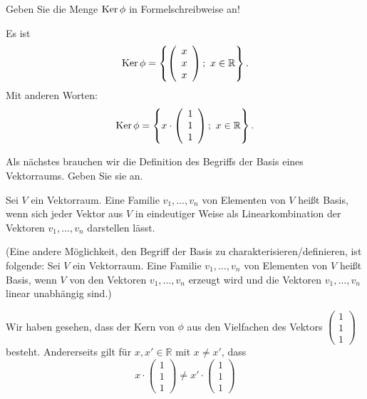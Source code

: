 \documentclass{ximera}
\begin{document}
\begin{question}
Geben Sie die Menge $\mathop{\rm Ker}\phi$ in Formelschreibweise an!
\begin{solution}
    \begin{free-response}
        Es ist 
\[
\mathop{\rm Ker}\phi = \left\{  \left(
\begin{array}{c}
x \\ x \\ x    
\end{array}
\right)  ;\ x\in \mathbb R  \right\}.
\]
Mit anderen Worten:
\[
\mathop{\rm Ker}\phi = \left\{ x\cdot  \left(
\begin{array}{c}
1 \\ 1 \\ 1    
\end{array}
\right)  ;\ x\in \mathbb R  \right\}.
\]

    \end{free-response}
\end{solution}
\end{question}


\begin{question}
    Als nächstes brauchen wir die Definition des Begriffs der Basis eines Vektorraums. Geben Sie sie an.
\begin{solution}
    \begin{free-response}
Sei $V$ ein Vektorraum. Eine Familie $v_1, \dots, v_n$ von Elementen von $V$ heißt Basis, wenn sich jeder Vektor aus $V$ in eindeutiger Weise als Linearkombination der Vektoren $v_1, \dots, v_n$ darstellen lässt.

(Eine andere Möglichkeit, den Begriff der Basis zu charakterisieren/definieren, ist folgende:
Sei $V$ ein Vektorraum. Eine Familie $v_1, \dots, v_n$ von Elementen von $V$ heißt Basis, wenn $V$ von den Vektoren $v_1,\dots, v_n$ erzeugt wird und die Vektoren $v_1, \dots, v_n$ linear unabhängig sind.)
    \end{free-response}
\end{solution}

\end{question}


Wir haben gesehen, dass der Kern von $\phi$ aus den  Vielfachen des Vektors $\left( \begin{array}{c}
    1 \\ 1\\ 1
\end{array} \right)$ besteht. Andererseits gilt für $x, x'\in \mathbb R$ mit $x\ne x'$, dass
\[
x\cdot  \left(
\begin{array}{c}
1 \\ 1 \\ 1    
\end{array}
\right) \ne  x'\cdot  \left(
\begin{array}{c}
1 \\ 1 \\ 1    
\end{array}
\right) 
\]
\end{document}
